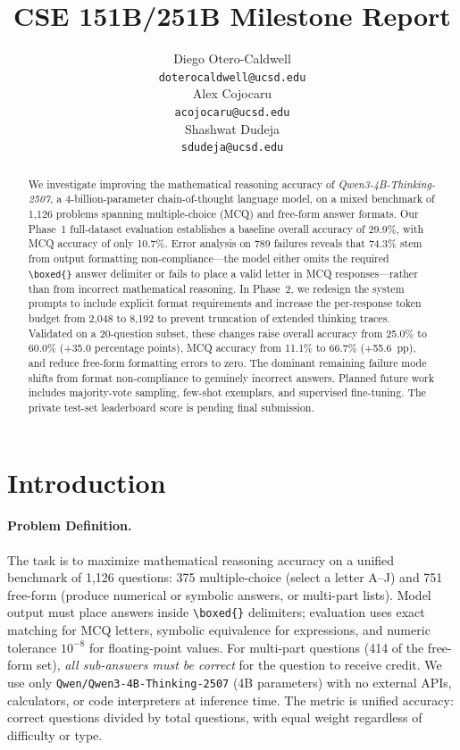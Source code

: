 \documentclass{article}
\title{
CSE 151B/251B Milestone Report
}
\author{%
  Diego Otero-Caldwell \\
  \texttt{doterocaldwell@ucsd.edu} \\
  \And
  Alex Cojocaru \\
  \texttt{acojocaru@ucsd.edu} \\
  \And
  Shashwat Dudeja \\
  \texttt{sdudeja@ucsd.edu} \\
}
\begin{document}
\maketitle


\begin{abstract}
We investigate improving the mathematical reasoning accuracy of \textit{Qwen3-4B-Thinking-2507}, a 4-billion-parameter chain-of-thought language model, on a mixed benchmark of 1,126 problems spanning multiple-choice (MCQ) and free-form answer formats. Our Phase~1 full-dataset evaluation establishes a baseline overall accuracy of 29.9\%, with MCQ accuracy of only 10.7\%. Error analysis on 789 failures reveals that 74.3\% stem from output formatting non-compliance—the model either omits the required \texttt{\textbackslash boxed\{\}} answer delimiter or fails to place a valid letter in MCQ responses—rather than from incorrect mathematical reasoning. In Phase~2, we redesign the system prompts to include explicit format requirements and increase the per-response token budget from 2,048 to 8,192 to prevent truncation of extended thinking traces. Validated on a 20-question subset, these changes raise overall accuracy from 25.0\% to 60.0\% (+35.0 percentage points), MCQ accuracy from 11.1\% to 66.7\% (+55.6~pp), and reduce free-form formatting errors to zero. The dominant remaining failure mode shifts from format non-compliance to genuinely incorrect answers. Planned future work includes majority-vote sampling, few-shot exemplars, and supervised fine-tuning. The private test-set leaderboard score is pending final submission.
\end{abstract}


\section{Introduction}
\label{sec:intro}

\paragraph{Problem Definition.}
The task is to maximize mathematical reasoning accuracy on a unified benchmark of 1,126 questions: 375 multiple-choice (select a letter A--J) and 751 free-form (produce numerical or symbolic answers, or multi-part lists). Model output must place answers inside \texttt{\textbackslash boxed\{\}} delimiters; evaluation uses exact matching for MCQ letters, symbolic equivalence for expressions, and numeric tolerance $10^{-8}$ for floating-point values. For multi-part questions (414 of the free-form set), \emph{all sub-answers must be correct} for the question to receive credit. We use only \texttt{Qwen/Qwen3-4B-Thinking-2507} (4B parameters) with no external APIs, calculators, or code interpreters at inference time. The metric is unified accuracy: correct questions divided by total questions, with equal weight regardless of difficulty or type.
\end{document}
